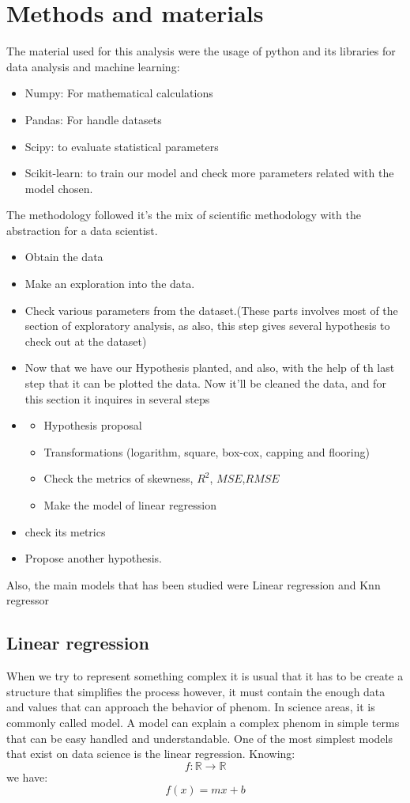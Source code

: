 \documentclass{article}
\begin{document}
\section{Methods and materials}
The material used for this analysis were the usage of python and its libraries for data analysis and machine learning:
\begin{itemize}
  \item Numpy: For mathematical calculations
  \item Pandas: For handle datasets 
  \item Scipy: to evaluate statistical parameters
  \item Scikit-learn: to train our model and check more parameters related with the model chosen.  
\end{itemize}
The methodology followed it's the mix of scientific methodology with the abstraction for a data scientist. 
\begin{itemize}
  \item Obtain the data
  \item Make an exploration into the data.
  \item Check various parameters from the dataset.(These parts involves most of the section of exploratory analysis, as also, this step gives several hypothesis to check out at the dataset)
  \item Now that we have our Hypothesis planted, and also, with the help of th last step that it can be plotted the data. Now it'll be cleaned the data, and for this section it inquires in several steps
  \item \begin{itemize}
    \item Hypothesis proposal
    \item Transformations (logarithm, square, box-cox, capping and flooring)
    \item Check the metrics of skewness, $R^2$, $MSE$,$RMSE$ 
    \item Make the model of linear regression 
  \end{itemize}
  \item check its metrics
  \item Propose another hypothesis.
\end{itemize}
Also, the main models that has been studied were Linear regression and Knn regressor
\subsection{Linear regression}
When we try to represent something complex it is usual that it has to be create a structure that simplifies the process however, it must contain the enough data and values that can approach the behavior of phenom. In science areas, it is commonly called model.
A model can explain a complex phenom in simple terms that can be easy handled and understandable.
One of the most simplest models that exist on data science is the linear regression. 
Knowing:
$$f:\mathbb{R} \rightarrow \mathbb{R} $$
we have:
$$f(x)=mx+b$$
\end{document}
